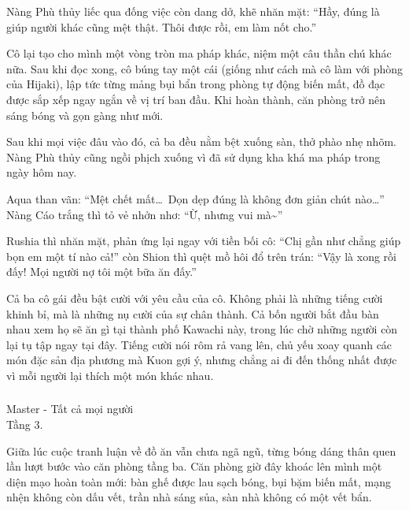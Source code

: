 \documentclass[../main.tex]{subfiles}
\begin{document}
Nàng Phù thủy liếc qua đống việc còn dang dở, khẽ nhăn mặt: ``Hầy,  đúng là giúp người khác cũng mệt thật. Thôi được rồi, em làm nốt cho.''

Cô lại tạo cho mình một vòng tròn ma pháp khác, niệm một câu thần chú khác nữa. Sau khi đọc xong, cô búng tay một cái (giống như cách mà cô làm với phòng của Hijaki), lập tức từng mảng bụi bẩn trong phòng tự động biến mất, đồ đạc được sắp xếp ngay ngắn về vị trí ban đầu. Khi hoàn thành, căn phòng trở nên sáng bóng và gọn gàng như mới.

Sau khi mọi việc đâu vào đó, cả ba đều nằm bệt xuống sàn, thở phào nhẹ nhõm. Nàng Phù thủy cũng ngồi phịch xuống vì đã sử dụng kha khá ma pháp trong ngày hôm nay.

Aqua than vãn: ``Mệt chết mất\dots\ Dọn dẹp đúng là không đơn giản chút nào\dots'' Nàng Cáo trắng thì tỏ vẻ nhởn nhơ: ``Ừ, nhưng vui mà\~{}''

Rushia thì nhăn mặt, phản ứng lại ngay với tiền bối cô: ``Chị gần như chẳng giúp bọn em một tí nào cả!'' còn Shion thì quệt mồ hôi đổ trên trán: ``Vậy là xong rồi đấy! Mọi người nợ tôi một bữa ăn đấy.''

Cả ba cô gái đều bật cười với yêu cầu của cô. Không phải là những tiếng cười khinh bỉ, mà là những nụ cười của sự chân thành. Cả bốn người bắt đầu bàn nhau xem họ sẽ ăn gì tại thành phố Kawachi này, trong lúc chờ những người còn lại tụ tập ngay tại đây. Tiếng cười nói rôm rả vang lên, chủ yếu xoay quanh các món đặc sản địa phương mà Kuon gợi ý, nhưng chẳng ai đi đến thống nhất được vì mỗi người lại thích một món khác nhau.

\vspace{-40pt} \subsubsection*{\label{ep-003.IVi}} 

\begin{center}
    {\color{T9} Master - Tất cả mọi người}\\Tầng 3.
\end{center}

Giữa lúc cuộc tranh luận về đồ ăn vẫn chưa ngã ngũ, từng bóng dáng thân quen lần lượt bước vào căn phòng tầng ba. Căn phòng giờ đây khoác lên mình một diện mạo hoàn toàn mới: bàn ghế được lau sạch bóng, bụi bặm biến mất, mạng nhện không còn dấu vết, trần nhà sáng sủa, sàn nhà không có một vết bẩn.
\end{document}
